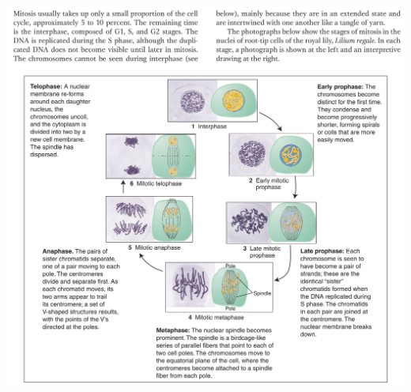 \documentclass[11pt,ignorenonframetext,aspectratio=169]{beamer}
\begin{document}
\begin{frame}{}
\protect\hypertarget{section-8}{}
\begin{center}\includegraphics[width=0.64\linewidth]{../images/mitosis_stages} \end{center}
\end{frame}
\end{document}
